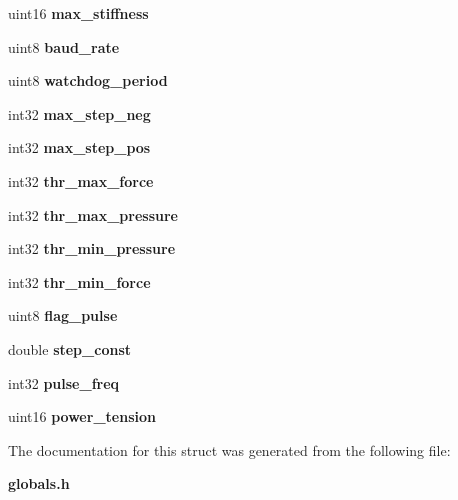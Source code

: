 \begin{DoxyCompactItemize}
\mbox{\label{structst__mem_aa20cd7437de72c537fd6bb84c158d51e}} 
uint16 {\bfseries max\+\_\+stiffness}
\item 
\mbox{\label{structst__mem_a1a2b3002580421effeca67955a862580}} 
uint8 {\bfseries baud\+\_\+rate}
\item 
\mbox{\label{structst__mem_a1aae70aad54a04c7b41a8d2dcd7aba14}} 
uint8 {\bfseries watchdog\+\_\+period}
\item 
\mbox{\label{structst__mem_a14fe3ed96d232dced2d33efc493a0667}} 
int32 {\bfseries max\+\_\+step\+\_\+neg}
\item 
\mbox{\label{structst__mem_a9be5987152b8c6bb28c1d311bc94e5e3}} 
int32 {\bfseries max\+\_\+step\+\_\+pos}
\item 
\mbox{\label{structst__mem_a60d82b418b3e6aa50300893cfc519a58}} 
int32 {\bfseries thr\+\_\+max\+\_\+force}
\item 
\mbox{\label{structst__mem_ab847275f75384c298dbbe9192b3b76e2}} 
int32 {\bfseries thr\+\_\+max\+\_\+pressure}
\item 
\mbox{\label{structst__mem_a858982429b2aa30b4d460806051b8cce}} 
int32 {\bfseries thr\+\_\+min\+\_\+pressure}
\item 
\mbox{\label{structst__mem_af83e1417974b4fbb30bb2243f200faeb}} 
int32 {\bfseries thr\+\_\+min\+\_\+force}
\item 
\mbox{\label{structst__mem_afa5e5478a19c622ec178dd922e17d5d8}} 
uint8 {\bfseries flag\+\_\+pulse}
\item 
\mbox{\label{structst__mem_adf608da2ecf07896b8ab840a2c66ff9a}} 
double {\bfseries step\+\_\+const}
\item 
\mbox{\label{structst__mem_ac0ec3d2c05fa21e51b7403a8190da3ff}} 
int32 {\bfseries pulse\+\_\+freq}
\item 
\mbox{\label{structst__mem_a59ed30e5aa7ccfd0b5f77c0805ac76f3}} 
uint16 {\bfseries power\+\_\+tension}
\end{DoxyCompactItemize}


The documentation for this struct was generated from the following file\+:\begin{DoxyCompactItemize}
\item 
\textbf{ globals.\+h}\end{DoxyCompactItemize}
